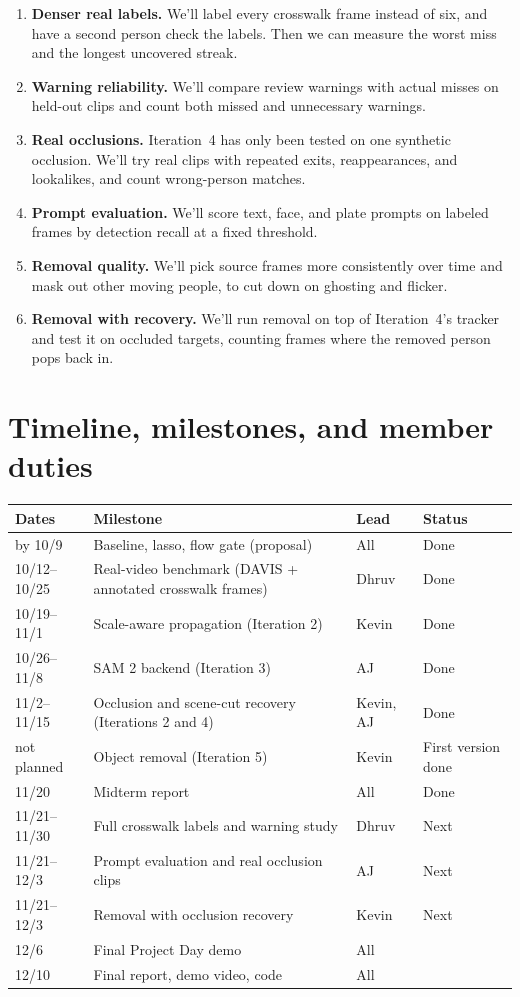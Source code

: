 \documentclass[10pt,letterpaper]{article}
\begin{document}
\begin{enumerate}
\item \textbf{Denser real labels.} We'll label every crosswalk frame instead of six, and have a
second person check the labels. Then we can measure the worst miss and the longest uncovered
streak.
\item \textbf{Warning reliability.} We'll compare review warnings with actual misses on held-out
clips and count both missed and unnecessary warnings.
\item \textbf{Real occlusions.} Iteration~4 has only been tested on one synthetic occlusion. We'll
try real clips with repeated exits, reappearances, and lookalikes, and count wrong-person matches.
\item \textbf{Prompt evaluation.} We'll score text, face, and plate prompts on labeled frames by
detection recall at a fixed threshold.
\item \textbf{Removal quality.} We'll pick source frames more consistently over time and mask out
other moving people, to cut down on ghosting and flicker.
\item \textbf{Removal with recovery.} We'll run removal on top of Iteration~4's tracker and test it
on occluded targets, counting frames where the removed person pops back in.
\end{enumerate}

\section{Timeline, milestones, and member duties}

\begin{center}
\small
\begin{tabular}{llll}
\toprule
Dates & Milestone & Lead & Status \\
\midrule
by 10/9      & Baseline, lasso, flow gate (proposal) & All & Done \\
10/12--10/25 & Real-video benchmark (DAVIS + annotated crosswalk frames) & Dhruv & Done \\
10/19--11/1  & Scale-aware propagation (Iteration 2) & Kevin & Done \\
10/26--11/8  & SAM 2 backend (Iteration 3) & AJ & Done \\
11/2--11/15  & Occlusion and scene-cut recovery (Iterations 2 and 4) & Kevin, AJ & Done \\
not planned  & Object removal (Iteration 5) & Kevin & First version done \\
11/20        & Midterm report & All & Done \\
11/21--11/30 & Full crosswalk labels and warning study & Dhruv & Next \\
11/21--12/3  & Prompt evaluation and real occlusion clips & AJ & Next \\
11/21--12/3  & Removal with occlusion recovery & Kevin & Next \\
12/6         & Final Project Day demo & All & \\
12/10        & Final report, demo video, code & All & \\
\bottomrule
\end{tabular}
\end{center}
\end{document}
